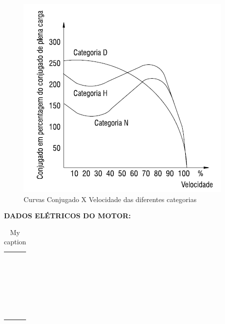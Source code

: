 \begin{figure}[!ht]
\centering
\includegraphics[scale=0.8]{figuras/conjugado_N.png}
\caption{Curvas Conjugado X Velocidade das diferentes categorias}
\label{fig:conjugado_N}
\end{figure}
\textbf{ DADOS ELÉTRICOS DO MOTOR:}
\begin{table}[]
\centering
\caption{My caption}
\label{my-label}
\begin{tabular}{ll}
 &  \\
 &  \\
 &  \\
 &  \\
 &  \\
 &  \\
 &  \\
 &  \\
 &  \\
 &  \\
 &  \\
 &  \\
 &  \\
 &  \\
 &  \\
 &  \\
 &  \\
 &  \\
 &  \\
 &  \\
 &  \\
 &  \\
 &  \\
 &  \\
 &  \\
 & 
\end{tabular}
\end{table}

